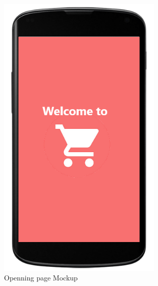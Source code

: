 \begin{figure}[H]
  \centering
  \includegraphics[width=0.7\textwidth,keepaspectratio]{images/2.png}
  \caption{Openning page Mockup}
\end{figure}
